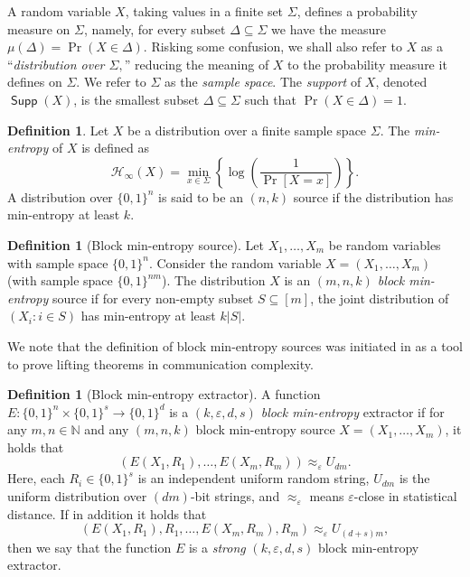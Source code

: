 \documentclass[11pt]{article}
\numberwithin{equation}{section}
\theoremstyle{definition}
\newtheorem{definition}[theorem]{Definition}
\theoremstyle{plain}
\def\entropy{\mathcal{H}}
\newcommand{\nnn}{\mathbb{N}}   %
\newcommand{\eps}{\varepsilon}
\DeclareMathOperator{\Supp}{\mathsf{Supp}}  %
\begin{document}
%
A random variable $X$, taking values in a finite set $\Sigma$,
defines a probability measure on $\Sigma$, namely,
for every subset $\Delta\subseteq\Sigma$ we have the measure
$\mu(\Delta)=\Pr(X\in\Delta)$.  Risking some confusion,
we shall also refer to $X$ as a ``\emph{distribution over $\Sigma,$}''
reducing the meaning of $X$ to the probability measure it defines
on $\Sigma$.  We refer to $\Sigma$ as the \emph{sample space}.
%
The \emph{support} of $X$, denoted $\Supp(X)$, is the smallest
subset $\Delta\subseteq\Sigma$ such that $\Pr(X\in\Delta)=1$.
%
%

\begin{definition} Let $X$ be a distribution over a
finite sample space $\Sigma$.  
The \emph{min-entropy} of $X$ is defined as
%
%
\[ \entropy_{\infty}(X) =
\min_{x\in\Sigma}\left\{\log\left(\frac{1}{\Pr[X=x]}\right)\right\}. \]
%
%
A distribution over 
$ \{0,1\}^{n}$ is said to be an $(n, k)$ source if
the distribution has min-entropy at least $k$.
\end{definition}


\begin{definition}[Block min-entropy source]
%
Let $X_1,\dots,X_m$ be random variables with sample space $\{0, 1\}^n$.
Consider the random variable $X=(X_1,\dots,X_m)$ (with sample space
$\{0, 1\}^{nm}$).  %
%
%
The distribution $X$   %
is an \emph{$(m, n, k)$ block min-entropy} source if for every
non-empty subset $S \subseteq [m]$, the joint distribution of
$(X_i: i \in S)$ has min-entropy at least $k|S|$.
\end{definition}

We note that the definition of block min-entropy sources was initiated
in \cite{GLMWZ16} as a tool to prove lifting theorems in communication
complexity.

\begin{definition}[Block min-entropy extractor]
A function $E:\{0,1\}^{n}\times\{0,1\}^{s}\rightarrow\{0,1\}^{d}$ is
a \emph{$(k,\eps,d,s)$ block min-entropy} extractor if for any
$m, n \in \nnn$ and any $(m, n, k)$ block min-entropy source
$X=(X_1, \ldots, X_m)$, it holds that
\[ (E(X_1, R_1), \ldots, E(X_m, R_m)) \approx_{\eps} U_{dm}. \]
Here, each $R_i \in \{0,1\}^{s}$ is an independent
uniform random string,
$U_{dm}$ is the uniform distribution over
%
$(dm)$-bit strings,  %
%
and $\approx_{\eps}$ means $\eps$-close in statistical distance.
If in addition it holds that
\[ (E(X_1, R_1), R_1, \ldots, E(X_m, R_m), R_m) \approx_{\eps} U_{(d+s)m}, \]
then we say that the function $E$ is a \emph{strong} $(k,\eps,d,s)$
block min-entropy extractor.
\end{definition}
\end{document}
